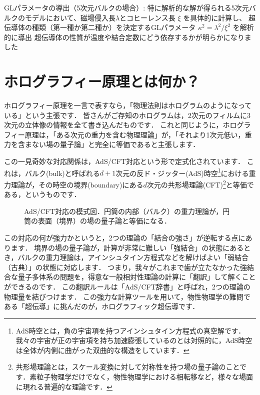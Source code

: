 \documentclass[b5paper,11pt,dvipdfmx]{jsarticle}
\numberwithin{equation}{section}
\theoremstyle{definition}
\begin{document}
GLパラメータの導出（5次元バルクの場合）:
特に解析的な解が得られる5次元バルクのモデルにおいて、磁場侵入長$\lambda$とコヒーレンス長 $\xi$ を具体的に計算し、
超伝導体の種類（第一種か第二種か）を決定するGLパラメータ $\kappa^2 = \lambda^2 / \xi^2$ を解析的に導出
超伝導体の性質が温度や結合定数にどう依存するかが明らかになりました









\clearpage


\section{ホログラフィー原理とは何か？}

ホログラフィー原理を一言で表すなら，「物理法則はホログラムのようになっている」という主張です．
皆さんがご存知のホログラムは，2次元のフィルムに3次元の立体像の情報を全て書き込んだものです．
これと同じように，ホログラフィー原理は，「ある次元の重力を含む物理理論」が，「それより1次元低い，重力を含まない場の量子論」と完全に等価であると主張します．

この一見奇妙な対応関係は，AdS/CFT対応\cite{Maldacena97}という形で定式化されています．
これは，バルク(bulk)と呼ばれる$d+1$次元の反ド・ジッター(AdS)時空\footnote{
AdS時空とは，負の宇宙項を持つアインシュタイン方程式の真空解です．我々の宇宙が正の宇宙項を持ち加速膨張しているのとは対照的に，AdS時空は全体が内側に曲がった双曲的な構造をしています．
}における重力理論が，その時空の境界(boundary)にある$d$次元の共形場理論(CFT)\footnote{
共形場理論とは，スケール変換に対して対称性を持つ場の量子論のことです．素粒子物理学だけでなく，物性物理学における相転移など，様々な場面に現れる普遍的な理論です．
}と等価である，というものです．

\begin{figure}[h]
    \centering
    \caption{AdS/CFT対応の模式図．円筒の内部（バルク）の重力理論が，円筒の表面（境界）の場の量子論と等価になる．}
    \label{fig:adscft}
\end{figure}

この対応の何が強力かというと，2つの理論の「結合の強さ」が逆転する点にあります．
境界の場の量子論が，計算が非常に難しい「強結合」の状態にあるとき，バルクの重力理論は，アインシュタイン方程式などを解けばよい「弱結合（古典）」の状態に対応します．
つまり，我々がこれまで歯が立たなかった強結合な量子多体系の問題を，得意な一般相対性理論の計算に「翻訳」して解くことができるのです．
この翻訳ルールは「AdS/CFT辞書」と呼ばれ，2つの理論の物理量を結びつけます．
この強力な計算ツールを用いて，物性物理学の難問である「超伝導」に挑んだのが，ホログラフィック超伝導です．
\end{document}
